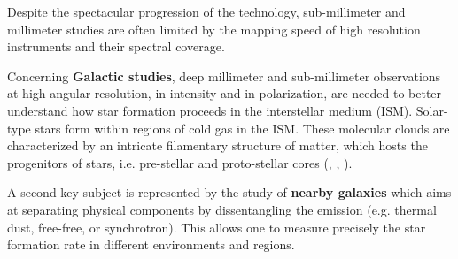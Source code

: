 \documentclass[]{aa} %
\begin{document}


Despite the spectacular progression of the technology, sub-millimeter and millimeter studies are often limited by the mapping speed of high resolution instruments and their spectral coverage. 

Concerning \textbf{Galactic studies}, deep millimeter and sub-millimeter observations at high angular resolution, in intensity and in polarization, are needed to better understand how star formation proceeds in the interstellar medium (ISM). Solar-type stars form within regions of cold gas in the ISM. These molecular clouds are characterized by an intricate filamentary structure of matter, which hosts the progenitors of stars, i.e. pre-stellar and proto-stellar cores (\cite{Andre2010}, \cite{Konyves2015}, \cite{Bracco2017}).

A second key subject is represented by the study of \textbf{nearby galaxies} which aims at separating physical components by dissentangling the emission (e.g. thermal dust, free-free, or synchrotron). This allows one to measure precisely the star formation rate in different environments and regions. 
\end{document}
